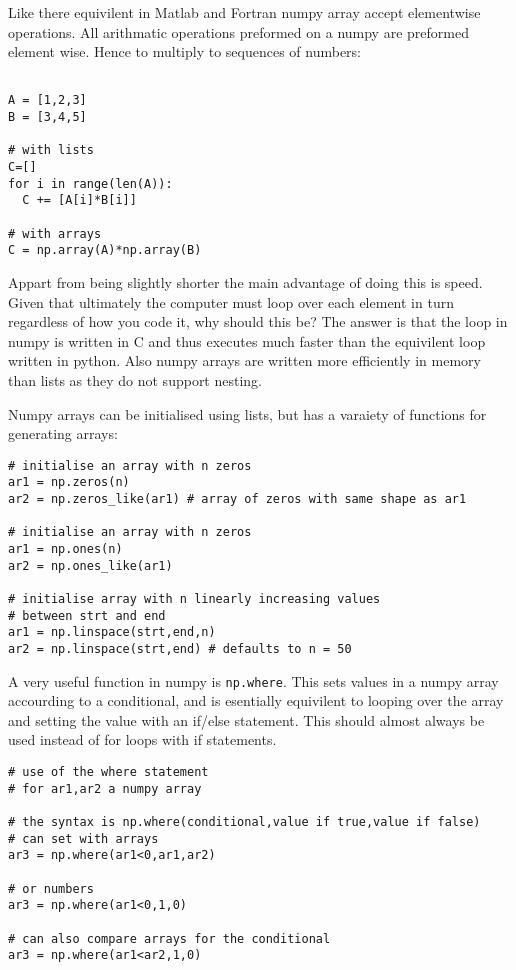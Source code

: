 \documentclass[11pt,a4paper]{article}
\begin{document}
Like there equivilent in Matlab and Fortran numpy array accept elementwise operations. All arithmatic operations preformed on a numpy are preformed element wise. Hence to multiply to sequences of numbers:

\begin{verbatim}

A = [1,2,3]
B = [3,4,5]

# with lists
C=[]
for i in range(len(A)):
  C += [A[i]*B[i]]

# with arrays
C = np.array(A)*np.array(B)

\end{verbatim}

Appart from being slightly shorter the main advantage of doing this is speed. Given that ultimately the computer must loop over each element in turn regardless of how you code it, why should this be? The answer is that the loop in numpy is written in C and thus executes much faster than the equivilent loop written in python. Also numpy arrays are written more efficiently in memory than lists as they do not support nesting.

Numpy arrays can be initialised using lists, but has a varaiety of functions for generating arrays:

\begin{verbatim}
# initialise an array with n zeros
ar1 = np.zeros(n)
ar2 = np.zeros_like(ar1) # array of zeros with same shape as ar1

# initialise an array with n zeros
ar1 = np.ones(n)
ar2 = np.ones_like(ar1) 

# initialise array with n linearly increasing values
# between strt and end  
ar1 = np.linspace(strt,end,n)
ar2 = np.linspace(strt,end) # defaults to n = 50

\end{verbatim}

A very useful function in numpy is \verb|np.where|. This sets values in a numpy array accourding to a conditional, and is esentially equivilent to looping over the array and setting the value with an if/else statement. This should almost always be used instead of for loops with if statements. 

\begin{verbatim}
# use of the where statement
# for ar1,ar2 a numpy array

# the syntax is np.where(conditional,value if true,value if false)
# can set with arrays
ar3 = np.where(ar1<0,ar1,ar2)

# or numbers
ar3 = np.where(ar1<0,1,0)

# can also compare arrays for the conditional
ar3 = np.where(ar1<ar2,1,0)

\end{verbatim} 
\end{document}
